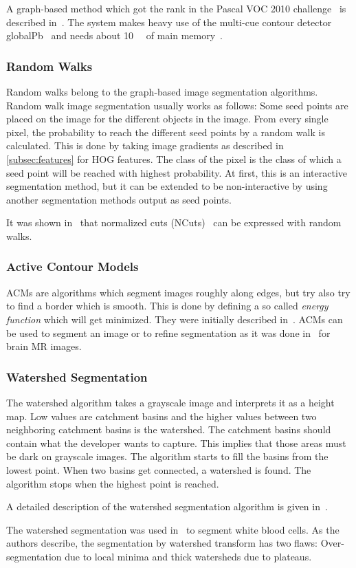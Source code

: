 A graph-based method which got the  rank in the Pascal VOC 2010
challenge~\cite{everingham2010pascal} is described
in~\cite{carreira2010constrained}. The system makes heavy use of the multi-cue
contour detector globalPb~\cite{4587420} and needs about \SI{10}{\giga\byte}
of main memory~\cite{Carreira2011}.


\subsubsection{Random Walks}

Random walks belong to the graph-based image segmentation algorithms. Random
walk image segmentation usually works as follows: Some seed points are placed
on the image for the different objects in the image. From every single pixel,
the probability to reach the different seed points by a random walk is
calculated. This is done by taking image gradients as described in
\cref{subsec:features} for \gls{HOG} features. The class of the pixel is the
class of which a seed point will be reached with highest probability. At first,
this is an interactive segmentation method, but it can be extended to be
non-interactive by using another segmentation methods output as seed points.

It was shown in~\cite{meilpa2001learning} that normalized cuts
(NCuts)~\cite{shi2000normalized} can be expressed with random walks.


\subsubsection{Active Contour Models}

\Glspl{ACM} are algorithms which segment images roughly along edges, but try
also try to find a border which is smooth. This is done by defining a so called
\textit{energy function} which will get minimized. They were initially
described in~\cite{kass1988snakes}. \Glspl{ACM} can be used to segment an image
or to refine segmentation as it was done in~\cite{atkins1998fully} for brain
\gls{MR} images.


\subsubsection{Watershed Segmentation}\label{subsec:watershed}
The watershed algorithm takes a grayscale image and interprets it as a height
map. Low values are catchment basins and the higher values between two
neighboring catchment basins is the watershed. The catchment basins should
contain what the developer wants to capture. This implies that those areas
must be dark on grayscale images. The algorithm starts to fill the basins from
the lowest point. When two basins get connected, a watershed is found. The
algorithm stops when the highest point is reached.

A detailed description of the watershed segmentation algorithm is given
in~\cite{roerdink2000watershed}.

The watershed segmentation was used in~\cite{1260033} to segment white blood
cells. As the authors describe, the segmentation by watershed transform has
two flaws: Over-segmentation due to local minima and thick watersheds due to
plateaus.
